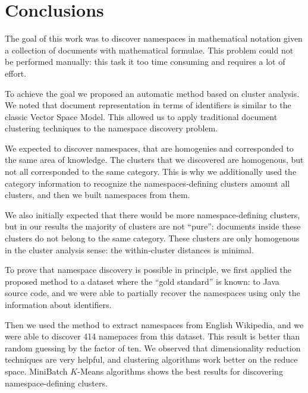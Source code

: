 \section{Conclusions} \label{sec:conclusions}

The goal of this work was to discover namespaces in mathematical notation
given a collection of documents with mathematical formulae. 
This problem could not be performed manually: this task it too time consuming
and requires a lot of effort. 

To achieve the goal we proposed an automatic method based on cluster analysis. 
We noted that document representation in terms of identifiers is similar 
to the classic Vector Space Model. This allowed us to apply traditional 
document clustering techniques to the namespace discovery problem. 

We expected to discover namespaces, that are homogenies and corresponded
to the same area of knowledge. The clusters that we discovered are homogenous, 
but not all corresponded to the same category. This is why we 
additionally used the category information to recognize the namespaces-defining
clusters amount all clusters, and then we built namespaces from them.

We also initially expected that there would be more namespace-defining clusters, 
but in our results the majority of clusters are not ``pure'': documents inside these 
clusters do not belong to the same category. These clusters are only homogenous in 
the cluster analysis sense: the within-cluster distances is minimal. 

To prove that namespace discovery is possible in principle, we first applied 
the proposed  method to a dataset where the ``gold standard'' is known: to Java source code,
and we were able to partially recover the namespaces using only the information
about identifiers. 



Then we used the method to extract namespaces from English Wikipedia,
and we were able to discover 414 namepaces from this dataset. This result 
is better than random guessing by the factor of ten. 
We observed that dimensionality reduction techniques
are very helpful, and clustering algorithms work better on the reduce space. 
MiniBatch $K$-Means algorithms shows the best results for discovering 
namespace-defining clusters.

